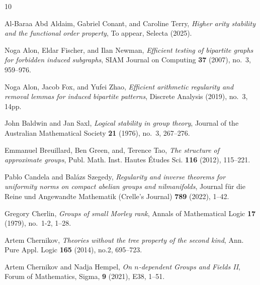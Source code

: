 \documentclass[12pt,oneside,british,a4wide]{amsart}
\numberwithin{equation}{section}
\theoremstyle{definition}
\begin{document}

%
%


\providecommand{\bysame}{\leavevmode\hbox to3em{\hrulefill}\thinspace}
\providecommand{\MR}{\relax\ifhmode\unskip\space\fi MR }
\providecommand{\MRhref}[2]{%
  \href{http://www.ams.org/mathscinet-getitem?mr=#1}{#2}
}
\providecommand{\href}[2]{#2}
\begin{thebibliography}{10}

Al-Baraa Abd Aldaim, Gabriel Conant, and Caroline Terry, \emph{{Higher arity stability and the functional order property}}, To appear, Selecta (2025).

Noga Alon, Eldar Fischer, and Ilan Newman, \emph{{Efficient testing of
  bipartite graphs for forbidden induced subgraphs}}, SIAM Journal on Computing
  \textbf{37} (2007), no.~3, 959--976.

Noga Alon, Jacob Fox, and Yufei Zhao, \emph{{Efficient arithmetic regularity
  and removal lemmas for induced bipartite patterns}}, Discrete Analysis (2019), no.~3, 14pp.


John Baldwin and Jan Saxl, \emph{{Logical stability in group theory}}, Journal
  of the Australian Mathematical Society \textbf{21} (1976), no.~3, 267--276.
  
Emmanuel Breuillard, Ben Green, and, Terence Tao, \emph{{The structure of approximate groups}}, Publ. Math. Inst. Hautes \'{E}tudes Sci. \textbf{116} (2012),  115--221.


Pablo Candela and Bal\'azs Szegedy, \emph{{Regularity and inverse theorems for
  uniformity norms on compact abelian groups and nilmanifolds}},
 Journal f\"ur die Reine und Angewandte Mathematik (Crelle's Journal) \textbf{789} (2022), 1--42.

Gregory Cherlin, \emph{{Groups of small Morley rank}}, Annals of Mathematical
  Logic \textbf{17} (1979), no.~1-2, 1--28.
  
Artem Chernikov, \emph{Theories without the tree property of the second kind}, Ann. Pure Appl. Logic \textbf{165} (2014), no.2, 695--723.
  
Artem Chernikov and Nadja Hempel, \emph{On $n$-dependent Groups and Fields II}, Forum of Mathematics, Sigma, \textbf{9} (2021), E38, 1--51.


\end{thebibliography}
\end{document}
